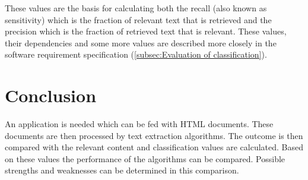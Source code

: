 These values are the basis for calculating  both the recall (also known as sensitivity) which is the fraction of relevant text that is retrieved and the precision which is the fraction of retrieved text that is relevant. These values, their dependencies and some more values are described more closely in the software requirement specification (\ref{subsec:Evaluation of classification}).

\section{Conclusion}

An application is needed which can be fed with HTML documents. These documents are then processed by text extraction algorithms. The outcome is then compared with the relevant content and classification values are calculated. Based on these values the performance of the algorithms can be compared. Possible strengths and weaknesses can be determined in this comparison.


